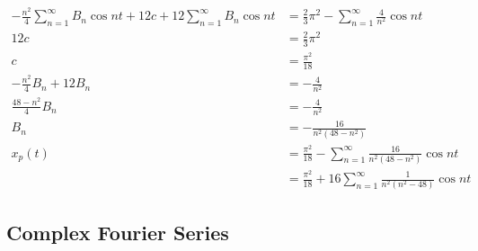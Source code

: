 \documentclass{article}
\begin{document}
\begin{align*}
  -\frac{n^2}{4} \sum_{n = 1}^\infty B_n \cos n t + 12 c + 12 \sum_{n = 1}^\infty B_n \cos n t & = \frac{2}{3} \pi^2 - \sum_{n = 1}^\infty \frac{4}{n^2} \cos n t              \\
  12 c                                                                                         & = \frac{2}{3} \pi^2                                                           \\
  c                                                                                            & = \frac{\pi^2}{18}                                                            \\
  -\frac{n^2}{4} B_n + 12 B_n                                                                  & = -\frac{4}{n^2}                                                              \\
  \frac{48 - n^2}{4} B_n                                                                       & = -\frac{4}{n^2}                                                              \\
  B_n                                                                                          & = -\frac{16}{n^2 (48 - n^2)}                                                  \\
  x_p(t)                                                                                       & = \frac{\pi^2}{18} - \sum_{n = 1}^\infty \frac{16}{n^2 (48 - n^2)} \cos n t   \\
                                                                                               & = \frac{\pi^2}{18} + 16 \sum_{n = 1}^\infty \frac{1}{n^2 (n^2 - 48)} \cos n t
\end{align*}

\subsection{Complex Fourier Series}

\subsubsection{}
\end{document}
